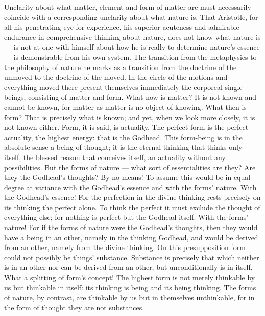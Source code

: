 \documentclass[12pt,a4paper]{book}
\begin{document}
Unclarity about what matter, element and form of matter are must necessarily coincide with a corresponding
unclarity about what nature is. That Aristotle, for all his
penetrating eye for experience, his superior acuteness and admirable endurance in comprehensive thinking about
nature, does not know what nature is --- is not at one with himself about how he is really to determine nature's
essence --- is demonstrable from his own system. The transition from the metaphysics to the philosophy of nature
he marks as a transition from the doctrine of the unmoved to the doctrine of the moved. In the circle of the
motions and everything moved there present themselves immediately the corporeal single beings, consisting of
matter and form. What now is matter? It is not known and cannot be known, for matter as matter is no object of
knowing. What then is form? That is precisely what is known; and yet, when we look more closely, it is not known
either. Form, it is said, is actuality. The perfect form is the perfect actuality, the highest energy: that is the
Godhead. This form-being is in the absolute sense a being of thought; it is the eternal thinking that thinks only
itself, the blessed reason that conceives itself, an actuality without any possibilities. But the forms of nature
--- what sort of essentialities are they? Are they the Godhead's thoughts? By no means! To assume this would be in
equal degree at variance with the Godhead's essence and with the forms' nature. With the Godhead's essence! For
the perfection in the divine thinking rests precisely on its thinking the perfect alone. To think the perfect it
must exclude the thought of everything else; for nothing is perfect but the Godhead itself. With the forms'
nature! For if the forms of nature were the Godhead's thoughts, then they would have a being in an other, namely in
the thinking Godhead, and would be derived from an other, namely from the divine thinking. On this presupposition
form could not possibly be things' substance. Substance is precisely that which neither is in an other nor can be
derived from an
other, but unconditionally is in itself. What a splitting of form's
concept! The highest form is not merely thinkable by us but thinkable in itself: its thinking is being and its
being thinking. The forms of nature, by contrast, are thinkable by us but in themselves unthinkable, for in the
form of thought they are not substances.
\end{document}
